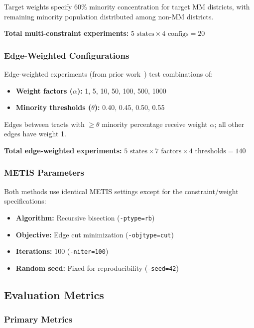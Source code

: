 Target weights specify 60\% minority concentration for target MM districts, with remaining minority population distributed among non-MM districts.

\textbf{Total multi-constraint experiments:} $5 \text{ states} \times 4 \text{ configs} = 20$

\subsubsection{Edge-Weighted Configurations}

Edge-weighted experiments (from prior work~\cite{dellaLibera2026edgeWeighted}) test combinations of:
\begin{itemize}
    \item \textbf{Weight factors ($\alpha$):} 1, 5, 10, 50, 100, 500, 1000
    \item \textbf{Minority thresholds ($\theta$):} 0.40, 0.45, 0.50, 0.55
\end{itemize}

Edges between tracts with $\geq\theta$ minority percentage receive weight $\alpha$; all other edges have weight 1.

\textbf{Total edge-weighted experiments:} $5 \text{ states} \times 7 \text{ factors} \times 4 \text{ thresholds} = 140$

\subsubsection{METIS Parameters}

Both methods use identical METIS settings except for the constraint/weight specifications:
\begin{itemize}
    \item \textbf{Algorithm:} Recursive bisection (\texttt{-ptype=rb})
    \item \textbf{Objective:} Edge cut minimization (\texttt{-objtype=cut})
    \item \textbf{Iterations:} 100 (\texttt{-niter=100})
    \item \textbf{Random seed:} Fixed for reproducibility (\texttt{-seed=42})
\end{itemize}

\subsection{Evaluation Metrics}

\subsubsection{Primary Metrics}

